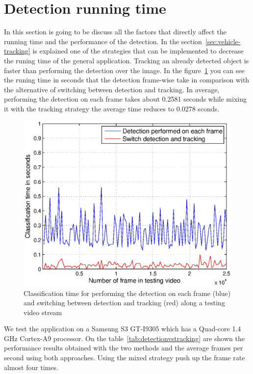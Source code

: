 
\section{Detection running time} %
\label{sec:running-time}

In this section is going to be discuss all the factors that directly affect the
running time and the performance of the detection. In the
section~\ref{sec:vehicle-tracking} is explained one of the strategies that can
be implemented to decrease the runing time of the general application. Tracking
an already detected object is faster than performing the detection over the
image. In the figure~\ref{fig:trackingvsdetection} you can see the runing time
in seconds that the detection frame-wise take in comparison with the alternative
of switching between detection and tracking. In average, performing the
detection on each frame takes about 0.2581 seconds while mixing it with the
tracking strategy the average time reduces to 0.0278 sconds.


\begin{figure}[h]
\centering
\includegraphics[width=\linewidth]{img/trackingvsdetection.eps}
\caption{Classification time for performing the detection on each
    frame (blue) and switching between detection and tracking (red) along a
    testing video stream}
\label{fig:trackingvsdetection}
\end{figure} 

We test the application on a Samsung S3 GT-I9305 which has a Quad-core 1.4 GHz
Cortex-A9 processor. On the table~\ref{tab:detectionvstracking} are shown the
performance results obtained with the two methods and the average frames per
second using both approaches. Using the mixed strategy push up the frame rate
almost four times.
 
